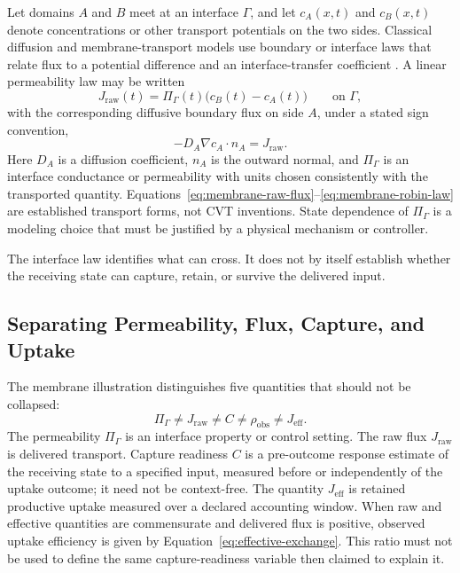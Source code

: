 \documentclass[11pt]{article}
\begin{document}
Let domains \(A\) and \(B\) meet at an interface \(\Gamma\), and let \(c_A(x,t)\) and \(c_B(x,t)\) denote concentrations or other transport potentials on the two sides. Classical diffusion and membrane-transport models use boundary or interface laws that relate flux to a potential difference and an interface-transfer coefficient \cite{crank1975,kedem1958}. A linear permeability law may be written
\begin{equation}
    J_{\mathrm{raw}}(t)
    =
    \Pi_{\Gamma}(t)
    \bigl(c_B(t)-c_A(t)\bigr)
    \qquad \text{on }\Gamma,
    \label{eq:membrane-raw-flux}
\end{equation}
with the corresponding diffusive boundary flux on side \(A\), under a stated sign convention,
\begin{equation}
    -D_A\nabla c_A\cdot n_A
    =
    J_{\mathrm{raw}}.
    \label{eq:membrane-robin-law}
\end{equation}
Here \(D_A\) is a diffusion coefficient, \(n_A\) is the outward normal, and \(\Pi_{\Gamma}\) is an interface conductance or permeability with units chosen consistently with the transported quantity. Equations~\eqref{eq:membrane-raw-flux}--\eqref{eq:membrane-robin-law} are established transport forms, not CVT inventions. State dependence of \(\Pi_{\Gamma}\) is a modeling choice that must be justified by a physical mechanism or controller.

The interface law identifies what can cross. It does not by itself establish whether the receiving state can capture, retain, or survive the delivered input.

\subsection{Separating Permeability, Flux, Capture, and Uptake}

The membrane illustration distinguishes five quantities that should not be collapsed:
\begin{equation}
    \Pi_{\Gamma}
    \neq
    J_{\mathrm{raw}}
    \neq
    C
    \neq
    \rho_{\mathrm{obs}}
    \neq
    J_{\mathrm{eff}}.
    \label{eq:membrane-separation}
\end{equation}
The permeability \(\Pi_{\Gamma}\) is an interface property or control setting. The raw flux \(J_{\mathrm{raw}}\) is delivered transport. Capture readiness \(C\) is a pre-outcome response estimate of the receiving state to a specified input, measured before or independently of the uptake outcome; it need not be context-free. The quantity \(J_{\mathrm{eff}}\) is retained productive uptake measured over a declared accounting window. When raw and effective quantities are commensurate and delivered flux is positive, observed uptake efficiency is given by Equation~\eqref{eq:effective-exchange}. This ratio must not be used to define the same capture-readiness variable then claimed to explain it.
\end{document}
